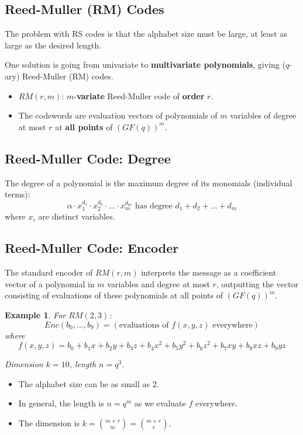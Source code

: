 \documentclass[11pt]{article}
\newtheorem{eg}{Example}
\begin{document}
\subsection{Reed-Muller (RM) Codes}
The problem with RS codes is that the alphabet size must be large, at least as large as the desired length.

One solution is going from univariate to \textbf{multivariate polynomials}, giving ($q$-ary) Reed-Muller (RM) codes.

\begin{itemize}
  \item $RM(r, m)$: $m$-\textbf{variate} Reed-Muller code of \textbf{order} $r$.
  \item The codewords are evaluation vectors of polynomials of $m$ variables of degree at most $r$ at \textbf{all points} of $(GF(q))^m$.
\end{itemize}

\subsection{Reed-Muller Code: Degree}
The degree of a polynomial is the maximum degree of its monomials (individual terms):
\[
  \alpha \cdot x_1^{d_1} \cdot x_2^{d_2} \cdot \ldots \cdot x_m^{d_m} \text{ has degree }
  d_1 + d_2 + \ldots + d_m
\]
where $x_i$ are distinct variables.

\subsection{Reed-Muller Code: Encoder}
The standard encoder of $RM(r, m)$ interprets the message as a coefficient vector of a polynomial in $m$ variables and degree at most $r$, outputting the vector consisting of evaluations of these polynomials at all points of $(GF(q))^m$.
\begin{eg}
  For $RM(2, 3)$:
  \[
    Enc(b_0, \ldots, b_9) = (\text{evaluations of } f(x, y, z) \text{ everywhere})
  \]
  where
  \[
    f(x, y, z) = b_0 + b_1x + b_2y + b_3z + b_4x^2 + b_5y^2 +b_6z^2 + b_7xy + b_8xz + b_9yz
  \]

  Dimension $k = 10$, length $n = q^3$.
\end{eg}

\begin{itemize}
  \item The alphabet size can be as small as $2$.
  \item In general, the length is $n = q^m$ as we evaluate $f$ everywhere.
  \item The dimension is $k = \binom{m + r}{m} = \binom{m + r}{r}$.
\end{itemize}
\end{document}
